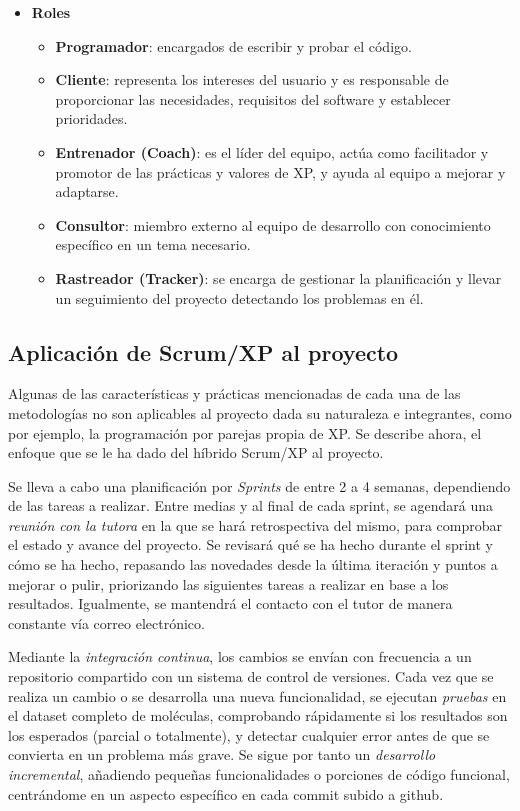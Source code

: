 \begin{itemize}
    \item \textbf{Roles}
    \begin{itemize}
        \item \textbf{Programador}: encargados de escribir y probar el código.
        \item \textbf{Cliente}: representa los intereses del usuario y es responsable de proporcionar las necesidades, requisitos del software y establecer prioridades. 
        \item \textbf{Entrenador (Coach)}: es el líder del equipo, actúa como facilitador y promotor de las prácticas y valores de XP, y ayuda al equipo a mejorar y adaptarse.
        \item \textbf{Consultor}: miembro externo al equipo de desarrollo con conocimiento específico en un tema necesario.
        \item \textbf{Rastreador (Tracker)}: se encarga de gestionar la planificación y llevar un seguimiento del proyecto detectando los problemas en él.
    \end{itemize}
\end{itemize}

\subsection{Aplicación de Scrum/XP al proyecto} \label{aplicacion_metod}

Algunas de las características y prácticas mencionadas de cada una de las metodologías no son aplicables al proyecto dada su naturaleza e integrantes, como por ejemplo, la programación por parejas propia de XP. Se describe ahora, el enfoque que se le ha dado del híbrido Scrum/XP al proyecto.

Se lleva a cabo una planificación por \emph{Sprints} de entre 2 a 4 semanas, dependiendo de las tareas a realizar. Entre medias y al final de cada sprint, se agendará una \emph{reunión con la tutora} en la que se hará retrospectiva del mismo, para comprobar el estado y avance del proyecto. Se revisará qué se ha hecho durante el sprint y cómo se ha hecho, repasando las novedades desde la última iteración y puntos a mejorar o pulir, priorizando las siguientes tareas a realizar en base a los resultados. Igualmente, se mantendrá el contacto con el tutor de manera constante vía correo electrónico.


Mediante la \emph{integración continua}, los cambios se envían con frecuencia a un repositorio compartido con un sistema de control de versiones. Cada vez que se realiza un cambio o se desarrolla una nueva funcionalidad, se ejecutan \emph{pruebas} en el dataset completo de moléculas, comprobando rápidamente si los resultados son los esperados (parcial o totalmente), y detectar cualquier error antes de que se convierta en un problema más grave. Se sigue por tanto un \emph{desarrollo incremental}, añadiendo pequeñas funcionalidades o porciones de código funcional, centrándome en un aspecto específico en cada commit subido a github.

